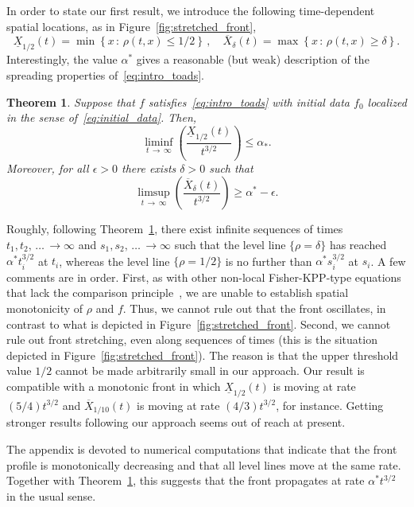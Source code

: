 \documentclass[10pt]{amsart}
\newtheorem{theo}{Theorem}[section]
\theoremstyle{definition}\newtheorem{defi}[theo]{Definition}\newtheorem{rema}[theo]{Remark}\newtheorem{exam}[theo]{Example}\newtheorem{exem}[theo]{Example}\newtheorem{nota}[theo]{Notation}
\newcommand{\1}{\mathds{1}}
\newcommand{\e}{\epsilon}
\begin{document}
In order to state our first result, we introduce the following time-dependent spatial locations, as in Figure~\ref{fig:stretched_front},
\[
\underline{X}_{1/2}(t) = \min\left\{x\,:\,\rho(t,x) \leq 1/2\right\} \,, \quad \overline{X}_{\delta}(t) = \max\left\{x\,:\,\rho(t,x) \geq \delta\right\}.
\]
Interestingly, the value $\alpha^*$ gives a reasonable (but weak) description of the spreading properties of~\eqref{eq:intro_toads}.

\begin{theo}\label{thm:propagation}
Suppose that $f$ satisfies~\eqref{eq:intro_toads} with initial data $f_0$ localized in the sense of~\eqref{eq:initial_data}. Then,
\[
\liminf_{t\,\to\,\infty} \left(\frac{\underline{X}_{1/2}(t)}{t^{3/2}}\right) \leq \alpha_*.
\]
Moreover, for all $\e>0$ there exists $\delta>0$ such that
\begin{equation}\label{eq:lower_bound}
\limsup_{t\,\to\,\infty} \left(\frac{\overline{X}_{\delta}(t)}{t^{3/2}}\right) \geq \alpha^* - \e.
\end{equation}
\end{theo}

Roughly, following Theorem~\ref{thm:propagation}, there exist infinite sequences of times $t_1, t_2, \,\dots\,\to \infty$ and $s_1,s_2,\,\dots\,\to\infty$ such that the level line $\{\rho = \delta\}$ has reached $\alpha^* t_i^{3/2}$ at $t_i$, whereas the level line $\{\rho = 1/2\}$ is no further than $\alpha^* s_i^{3/2}$ at $s_i$. A few comments are in order. First, as with other non-local Fisher-KPP-type equations that lack the comparison principle~\cite{berestycki_non-local_2009}, we are unable to establish spatial monotonicity of $\rho$ and $f$. Thus, we cannot rule out that the front oscillates, in contrast to what is depicted in Figure~\ref{fig:stretched_front}. Second, we cannot rule out front stretching, even along sequences of times (this is the situation depicted in Figure~\ref{fig:stretched_front}). The reason is that the upper threshold value $1/2$ cannot be made arbitrarily small in our approach. Our result is compatible with a monotonic front in which $\underline{X}_{1/2}(t)$ is moving at rate $(5/4)t^{3/2}$ and $\overline{X}_{1/10}(t)$ is moving at rate $(4/3)t^{3/2}$, for instance. Getting stronger results following our approach seems out of reach at present.

The appendix is devoted to numerical computations that indicate that the front profile is monotonically decreasing and that all level lines move at the same rate. Together with Theorem~\ref{thm:propagation}, this suggests that the front propagates at rate $\alpha^* t^{3/2}$ in the usual sense.
\end{document}
